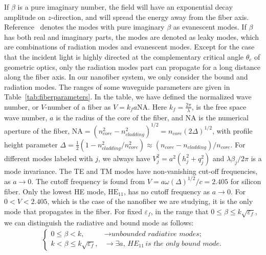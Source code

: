 \documentclass[]{report}
\begin{document}
If $ \beta $ is a pure imaginary number, the field will have an exponential decay amplitude on $ z $-direction, and will spread the energy away from the fiber axis. Reference~\cite{Snyder1983} denotes the modes with pure imaginary $ \beta $ as evanescent modes. If $ \beta $ has both real and imaginary parts, the modes are denoted as leaky modes, which are combinations of radiation modes and evanescent modes. Except for the case that the incident light is highly directed at the complementary critical angle $ \theta_c $ of geometric optics, only the radiation modes part can propagate for a long distance along the fiber axis. In our nanofiber system, we only consider the bound and radiation modes. The ranges of some waveguide parameters are given in Table~\ref{tab:fiberparameters}. 
In the table, we have defined the normalized wave number\cite{Snyder1983}, or 
$V$-number 
of a fiber as $V  = 
k_f a \mathrm{NA}$.  Here $k_f=\frac{2\pi}{\lambda}$, is the free space wave number, $a$ is the radius 
of the core of the fiber, and $\mathrm{NA}$ is the numerical aperture of 
the fiber, $\mathrm{NA} = 
(n_{core}^2 - n_{cladding}^2)^{1/2} = n_{core}(2\Delta)^{1/2}$, with profile height 
parameter 
$\Delta =\frac{1}{2}(1-n_{cladding}^2/n_{core}^2)\approx (n_{core}-n_{cladding})/n_{core}$.  For 
different modes labeled with $ j $, we always have $V_j^2=a^2(h_j^2+q_j^2)$ and $ \lambda\beta_j/2\pi $ is a mode invariance.  The TE and TM modes have non-vanishing cut-off 
frequencies, as $ a\rightarrow 0 $.  The cutoff frequency is found from $V = a\omega (\Delta)^{1/2}/c =2.405$ for silicon fiber.  
Only the lowest HE mode, $\mathrm{HE}_{11}$, has no cutoff frequency as $ a\rightarrow 0 $.  For $0 < V < 2.405$, which is the case of the nanofiber we are studying, it is the only mode that propagates in the 
fiber. For fixed $ \varepsilon_f $, in the range that $ 0\leq \beta \leq 
k\sqrt{\varepsilon_f} $, we can distinguish the radiative and bound mode as follows:
\begin{align}
\begin{cases}
0\leq \beta < k, &\rightarrow \textit{unbounded radiative modes;}\\
k< \beta \leq k \sqrt{\varepsilon_f}, &\rightarrow \exists a,\, \textit{HE}_{11}\, \textit{is the only 
bound mode.}
\end{cases}
\end{align}
\end{document}

